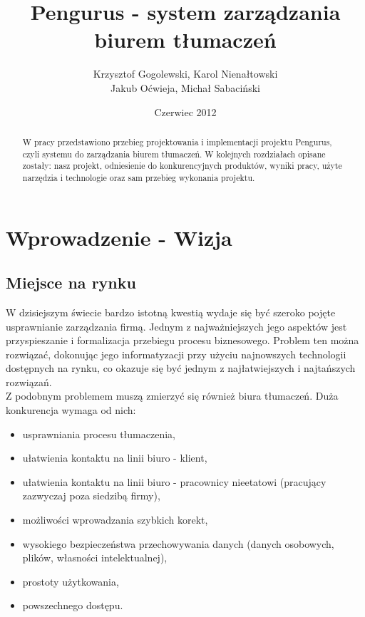 \documentclass[licencjacka]{pracamgr}
\author{Krzysztof Gogolewski, Karol Nienałtowski\\Jakub Oćwieja, Michał Sabaciński}
\title{Pengurus - system zarządzania biurem tłumaczeń}
\date{Czerwiec 2012}
\begin{document}
\maketitle

\begin{abstract}
  W pracy przedstawiono przebieg projektowania i implementacji projektu Pengurus, czyli systemu do zarządzania biurem tłumaczeń.
  W kolejnych rozdziałach opisane zostały: nasz projekt, odniesienie do konkurencyjnych produktów, wyniki pracy, użyte narzędzia i technologie oraz sam przebieg wykonania projektu.
\end{abstract}

\tableofcontents

\chapter{Wprowadzenie - Wizja}
\section{Miejsce na rynku}
W dzisiejszym świecie bardzo istotną kwestią wydaje się być szeroko pojęte usprawnianie zarządzania firmą. 
Jednym z najważniejszych jego aspektów jest przyspieszanie i formalizacja przebiegu procesu biznesowego. 
Problem ten można rozwiązać, dokonując jego informatyzacji przy użyciu najnowszych technologii dostępnych na rynku, co okazuje się być jednym z najłatwiejszych i najtańszych rozwiązań. \\

Z podobnym problemem muszą zmierzyć się również biura tłumaczeń. Duża konkurencja wymaga od nich: 
\begin{itemize}
\item usprawniania procesu tłumaczenia, 
\item ułatwienia kontaktu na linii biuro - klient, 
\item ułatwienia kontaktu na linii biuro - pracownicy nieetatowi (pracujący zazwyczaj poza siedzibą firmy), 
\item możliwości wprowadzania szybkich korekt,
\item wysokiego bezpieczeństwa przechowywania danych (danych osobowych, plików, własności intelektualnej),
\item prostoty użytkowania,
\item powszechnego dostępu. 
\end{itemize} 
\end{document}
